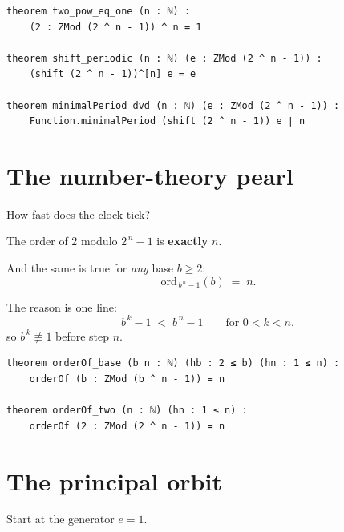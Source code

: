 \documentclass[11pt]{article}
\begin{document}
\begin{lstlisting}
theorem two_pow_eq_one (n : ℕ) :
    (2 : ZMod (2 ^ n - 1)) ^ n = 1

theorem shift_periodic (n : ℕ) (e : ZMod (2 ^ n - 1)) :
    (shift (2 ^ n - 1))^[n] e = e

theorem minimalPeriod_dvd (n : ℕ) (e : ZMod (2 ^ n - 1)) :
    Function.minimalPeriod (shift (2 ^ n - 1)) e ∣ n
\end{lstlisting}

\bigskip


\newpage


\section{The number-theory pearl}

\bigskip

How fast does the clock tick?

\bigskip

The order of $2$ modulo $2^{\,n}-1$ is \textbf{exactly} $n$.

\bigskip

And the same is true for \emph{any} base $b \ge 2$:
\[
  \mathrm{ord}_{\,b^{\,n}-1}(b) \;=\; n .
\]

\bigskip

The reason is one line:
\[
  b^{\,k}-1 \;<\; b^{\,n}-1
  \qquad\text{for } 0 < k < n,
\]
so $b^{\,k}\not\equiv 1$ before step $n$.

\begin{lstlisting}
theorem orderOf_base (b n : ℕ) (hb : 2 ≤ b) (hn : 1 ≤ n) :
    orderOf (b : ZMod (b ^ n - 1)) = n

theorem orderOf_two (n : ℕ) (hn : 1 ≤ n) :
    orderOf (2 : ZMod (2 ^ n - 1)) = n
\end{lstlisting}

\bigskip


\newpage


\section{The principal orbit}

\bigskip

Start at the generator $e = 1$.

\bigskip
\end{document}
